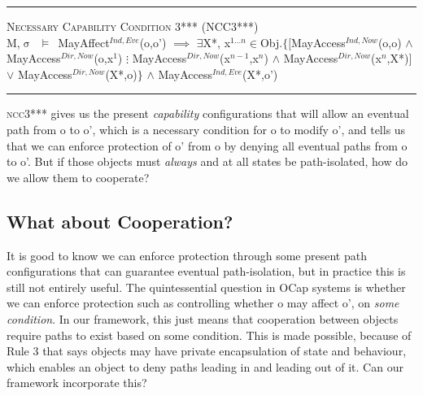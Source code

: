 \documentclass[a4paper,11pt, twoside,twocolumn]{article}
\newenvironment{logic}[1][]
{\begin{flushleft} \small }
{\end{flushleft}}
\newcommand{\loin}{$\in$}
\newcommand{\loexists}{$\exists$}
\newcommand{\loand}{$\land$}
\newcommand{\loor} {$\lor$}
\newcommand{\loimplies}{$\implies$}
\newcommand{\losigma}{$\upsigma$}
\newcommand{\loturns} {$\vDash$}
\newcommand{\ablock} {\null\qquad}
\begin{document}
\begin{logic}
\hrule\null
\textsc{\normalsize *Necessary Capability Condition 3*** (NCC3***)}\\
M,\losigma\ \loturns\ MayAffect$^{Ind,Eve}$(o,o')\linebreak
\ablock \loimplies\linebreak
\ablock \loexists X*, x$^{1...n}$\loin Obj.$\{[$MayAccess$^{Ind,Now}$(o,o)\linebreak
\ablock \ablock \ablock \ablock \ablock \loand\linebreak
\ablock \ablock \ablock \ablock \ablock MayAccess$^{Dir,Now}$(o,x$^1$)\linebreak
\ablock \ablock \ablock \ablock \ablock $\vdots$\linebreak
\ablock \ablock \ablock \ablock \ablock MayAccess$^{Dir,Now}$(x$^{n-1}$,x$^n$)\linebreak
\ablock \ablock \ablock \ablock \ablock \loand\linebreak
\ablock \ablock \ablock \ablock \ablock MayAccess$^{Dir,Now}$(x$^n$,X*)$]$\linebreak
\ablock \ablock \ablock \ablock \quad\: \loor \linebreak
\ablock \ablock \ablock \ablock \quad\: MayAccess$^{Dir,Now}$(X*,o)$\}$\linebreak
\ablock \ablock \ablock \ablock \loand \linebreak
\ablock \ablock \ablock \quad MayAccess$^{Ind,Eve}$(X*,o')
\linebreak\\
\hrule
\end{logic}

\textsc{ncc3***} gives us the present \textit{capability} configurations that will allow an eventual path from o to o', which is a necessary condition for o to modify o', and tells us that we can enforce protection of o' from o by denying all eventual paths from o to o'. But if those objects must \textit{always} and at all states be path-isolated, how do we allow them to cooperate? 

\subsection{What about Cooperation?}


It is good to know we can enforce protection through some present path configurations that can guarantee eventual path-isolation, but in practice this is still not entirely useful. The quintessential question in OCap systems is whether we can enforce protection such as controlling whether o may affect o', on \textit{some condition}. In our framework, this just means that cooperation between objects require paths to exist based on some condition. This is made possible, because of Rule 3 that says objects may have private encapsulation of state and behaviour, which enables an object to deny paths leading in and leading out of it. Can our framework incorporate this?\\
\end{document}
